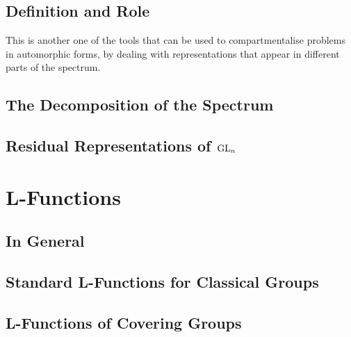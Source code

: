 \subsection{Definition and Role}
This is another one of the tools that can be used to compartmentalise problems in automorphic forms, by dealing with representations that appear in different parts of the spectrum. 

\subsection{The Decomposition of the Spectrum}


\subsection{Residual Representations of \(\operatorname{GL}_n\)}


\section{L-Functions}
\subsection{In General}
\subsection{Standard L-Functions for Classical Groups}
\subsection{L-Functions of Covering Groups}
